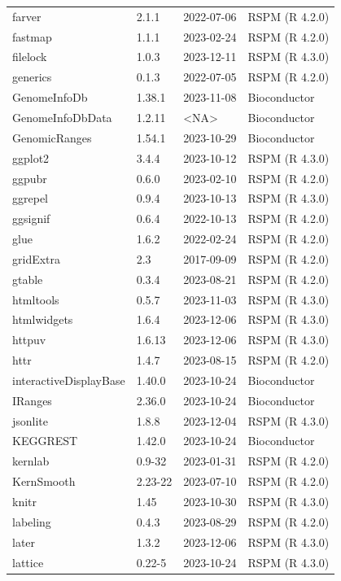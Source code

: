 \documentclass[graybox]{svmult}
\begin{document}
\begin{tabular}{llll}
farver & 2.1.1 & 2022-07-06 & RSPM (R 4.2.0)\\
fastmap & 1.1.1 & 2023-02-24 & RSPM (R 4.2.0)\\
filelock & 1.0.3 & 2023-12-11 & RSPM (R 4.3.0)\\
generics & 0.1.3 & 2022-07-05 & RSPM (R 4.2.0)\\
GenomeInfoDb & 1.38.1 & 2023-11-08 & Bioconductor\\
\addlinespace
GenomeInfoDbData & 1.2.11 & <NA> & Bioconductor\\
GenomicRanges & 1.54.1 & 2023-10-29 & Bioconductor\\
ggplot2 & 3.4.4 & 2023-10-12 & RSPM (R 4.3.0)\\
ggpubr & 0.6.0 & 2023-02-10 & RSPM (R 4.2.0)\\
ggrepel & 0.9.4 & 2023-10-13 & RSPM (R 4.3.0)\\
\addlinespace
ggsignif & 0.6.4 & 2022-10-13 & RSPM (R 4.2.0)\\
glue & 1.6.2 & 2022-02-24 & RSPM (R 4.2.0)\\
gridExtra & 2.3 & 2017-09-09 & RSPM (R 4.2.0)\\
gtable & 0.3.4 & 2023-08-21 & RSPM (R 4.2.0)\\
htmltools & 0.5.7 & 2023-11-03 & RSPM (R 4.3.0)\\
\addlinespace
htmlwidgets & 1.6.4 & 2023-12-06 & RSPM (R 4.3.0)\\
httpuv & 1.6.13 & 2023-12-06 & RSPM (R 4.3.0)\\
httr & 1.4.7 & 2023-08-15 & RSPM (R 4.2.0)\\
interactiveDisplayBase & 1.40.0 & 2023-10-24 & Bioconductor\\
IRanges & 2.36.0 & 2023-10-24 & Bioconductor\\
\addlinespace
jsonlite & 1.8.8 & 2023-12-04 & RSPM (R 4.3.0)\\
KEGGREST & 1.42.0 & 2023-10-24 & Bioconductor\\
kernlab & 0.9-32 & 2023-01-31 & RSPM (R 4.2.0)\\
KernSmooth & 2.23-22 & 2023-07-10 & RSPM (R 4.2.0)\\
knitr & 1.45 & 2023-10-30 & RSPM (R 4.3.0)\\
\addlinespace
labeling & 0.4.3 & 2023-08-29 & RSPM (R 4.2.0)\\
later & 1.3.2 & 2023-12-06 & RSPM (R 4.3.0)\\
lattice & 0.22-5 & 2023-10-24 & RSPM (R 4.3.0)\\

\end{tabular}
\end{document}
